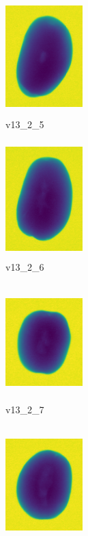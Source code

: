 \documentclass[11pt]{article}
\begin{document}
\begin{figure}
    
         \begin{subfigure}[b]{0.15\textwidth}
         \centering
         \includegraphics[width=3cm, height=4.5cm]{images/kartofler/v13_2_5_cut.png}
         \caption{v13\_2\_5}
         \label{fig:y equals x}
     \end{subfigure}
     \hfill
     \begin{subfigure}[b]{0.15\textwidth}
         \centering
         \includegraphics[width=3cm, height=4.5cm]{images/kartofler/v13_2_6_cut.png}
        \caption{v13\_2\_6}
         \label{fig:three sin x}
     \end{subfigure}
     \hfill
     \begin{subfigure}[b]{0.15\textwidth}
         \centering
         \includegraphics[width=3cm, height=4.5cm]{images/kartofler/v13_2_7_cut.png}
        \caption{v13\_2\_7}
         \label{fig:five over x}
     \end{subfigure}
     \hfill
    \begin{subfigure}[b]{0.15\textwidth}
         \centering
         \includegraphics[width=3cm, height=4.5cm]{images/kartofler/v13_2_8_cut.png}

\end{subfigure}
\end{figure}
\end{document}

